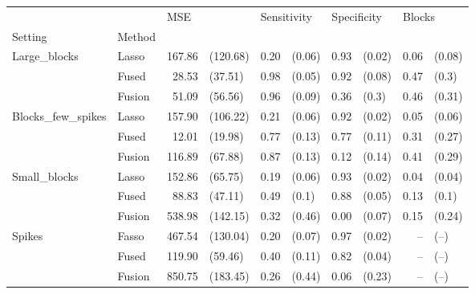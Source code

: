 \begin{tabular}{llrlrlrlrl}
\toprule
       &        & \multicolumn{2}{l}{MSE} & \multicolumn{2}{l}{Sensitivity} & \multicolumn{2}{l}{Specificity} & \multicolumn{2}{l}{Blocks} \\
Setting & Method &         &           &              &         &              &         &         &         \\
\midrule
Large\_blocks & Lasso &  167.86 &  (120.68) &         0.20 &  (0.06) &         0.93 &  (0.02) &    0.06 &  (0.08) \\
       & Fused &   28.53 &   (37.51) &         0.98 &  (0.05) &         0.92 &  (0.08) &    0.47 &   (0.3) \\
       & Fusion &   51.09 &   (56.56) &         0.96 &  (0.09) &         0.36 &   (0.3) &    0.46 &  (0.31) \\
Blocks\_few\_spikes & Lasso &  157.90 &  (106.22) &         0.21 &  (0.06) &         0.92 &  (0.02) &    0.05 &  (0.06) \\
       & Fused &   12.01 &   (19.98) &         0.77 &  (0.13) &         0.77 &  (0.11) &    0.31 &  (0.27) \\
       & Fusion &  116.89 &   (67.88) &         0.87 &  (0.13) &         0.12 &  (0.14) &    0.41 &  (0.29) \\
Small\_blocks & Lasso &  152.86 &   (65.75) &         0.19 &  (0.06) &         0.93 &  (0.02) &    0.04 &  (0.04) \\
       & Fused &   88.83 &   (47.11) &         0.49 &   (0.1) &         0.88 &  (0.05) &    0.13 &   (0.1) \\
       & Fusion &  538.98 &  (142.15) &         0.32 &  (0.46) &         0.00 &  (0.07) &    0.15 &  (0.24) \\
Spikes & Fasso &  467.54 &  (130.04) &         0.20 &  (0.07) &         0.97 &  (0.02) &     -- &   (--) \\
       & Fused &  119.90 &   (59.46) &         0.40 &  (0.11) &         0.82 &  (0.04) &     -- &   (--) \\
       & Fusion &  850.75 &  (183.45) &         0.26 &  (0.44) &         0.06 &  (0.23) &     -- &   (--) \\
\bottomrule
\end{tabular}
